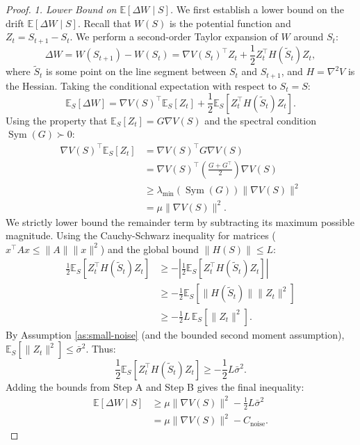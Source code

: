 \documentclass[12pt]{article}
\DeclareMathOperator{\Sym}{Sym}
\begin{document}
\begin{proof}
\textit{1. Lower Bound on $\mathbb{E}[\Delta W \mid S]$.} We first establish a lower bound on the drift $\mathbb{E}[\Delta W \mid S]$. Recall that $W(S)$ is the potential function and $Z_t = S_{t+1} - S_t$. We perform a second-order Taylor expansion of $W$ around $S_t$: 
\[
\Delta W = W(S_{t+1}) - W(S_t) = \nabla V(S_t)^\top Z_t + \frac{1}{2} Z_t^\top H(\tilde{S}_t) Z_t,
\]
where $\tilde{S}_t$ is some point on the line segment between $S_t$ and $S_{t+1}$, and $H = \nabla^2 V$ is the Hessian. Taking the conditional expectation with respect to $S_t = S$:
\[
\mathbb{E}_S[\Delta W] = \nabla V(S)^\top \mathbb{E}_S[Z_t] + \frac{1}{2} \mathbb{E}_S\left[ Z_t^\top H(\tilde{S}_t) Z_t \right].
\]
Using the property that $\mathbb{E}_S[Z_t] = G \nabla V(S)$ and the spectral condition $\Sym(G) \succ 0$:
\[
\begin{aligned}
\nabla V(S)^\top \mathbb{E}_S[Z_t] &= \nabla V(S)^\top G \nabla V(S) \\
&= \nabla V(S)^\top \left( \frac{G + G^\top}{2} \right) \nabla V(S) \\
&\ge \lambda_{\min}(\Sym(G)) \|\nabla V(S)\|^2 \\
&= \mu \|\nabla V(S)\|^2.
\end{aligned}
\]
We strictly lower bound the remainder term by subtracting its maximum possible magnitude. Using the Cauchy-Schwarz inequality for matrices ($x^\top A x \le \|A\| \|x\|^2$) and the global bound $\|H(S)\| \le L$:
\[
\begin{aligned}
\frac{1}{2} \mathbb{E}_S\left[ Z_t^\top H(\tilde{S}_t) Z_t \right] &\ge - \left| \frac{1}{2} \mathbb{E}_S\left[ Z_t^\top H(\tilde{S}_t) Z_t \right] \right| \\
&\ge - \frac{1}{2} \mathbb{E}_S\left[ \|H(\tilde{S}_t)\| \|Z_t\|^2 \right] \\
&\ge - \frac{1}{2} L \, \mathbb{E}_S\left[ \|Z_t\|^2 \right].
\end{aligned}\]
By Assumption \ref{as:small-noise} (and the bounded second moment assumption), $\mathbb{E}_S[\|Z_t\|^2] \le \bar{\sigma}^2$. Thus:
\[
\frac{1}{2} \mathbb{E}_S\left[ Z_t^\top H(\tilde{S}_t) Z_t \right] \ge - \frac{1}{2} L \bar{\sigma}^2.
\]
Adding the bounds from Step A and Step B gives the final inequality:
\[
\begin{aligned}
\mathbb{E}[\Delta W \mid S] &\ge \mu \|\nabla V(S)\|^2 - \frac{1}{2} L \bar{\sigma}^2 \\
&= \mu \|\nabla V(S)\|^2 - C_{\text{noise}}.
\end{aligned}
\]


\end{proof}
\end{document}
